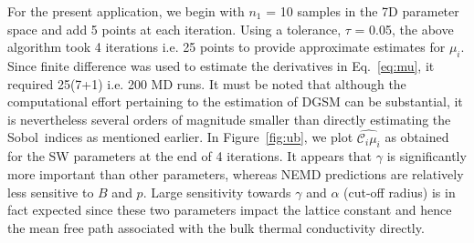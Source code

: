 %

For the present application, we begin with $n_1$ = 10 samples in the 7D parameter space and add 5 points
at each iteration. Using a tolerance, $\tau$ = 0.05, the above algorithm took 4 iterations i.e. 25 points to 
provide approximate estimates for $\mu_i$. Since finite difference was used to estimate the derivatives in
Eq.~\ref{eq:mu}, it required 25(7+1) i.e. 200 MD runs. It must be noted that although the computational effort
pertaining to the estimation of DGSM can be substantial, it is nevertheless several orders of magnitude smaller
than directly estimating the Sobol\textquotesingle~indices as mentioned earlier. 
In Figure~\ref{fig:ub}, we plot $\hat{\mathcal{C}_i\mu_i}$ as obtained for the SW parameters at the 
end of 4 iterations. It appears that $\gamma$ is significantly more important than other parameters, whereas NEMD
predictions are relatively less sensitive to $B$ and $p$. Large sensitivity towards 
$\gamma$ and $\alpha$ (cut-off radius) is in fact expected since  these two parameters impact the lattice
constant and hence the mean free path associated with the bulk thermal conductivity directly. 

